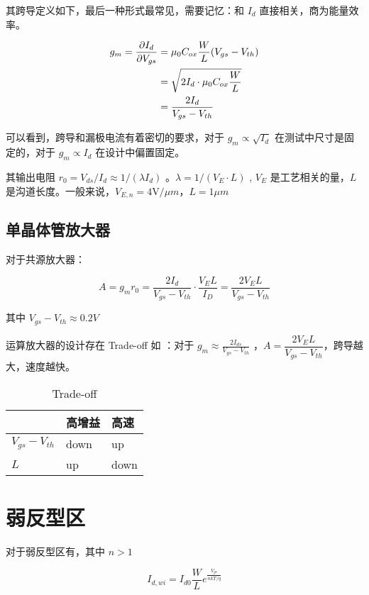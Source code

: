 \documentclass[cn,11pt,chinese,black,simple]{../elegantbook}
\begin{document}
其跨导定义如下，最后一种形式最常见，需要记忆：和 \(I_d\) 直接相关，商为能量效率。

\[
\begin{aligned}
    g_m = \frac{\partial{}I_d}{\partial{}V_{gs}} &= \mu_0 C_{ox} \frac{W}{L}(V_{gs} - V_{th}) \\
    &= \sqrt{{2 I_d \cdot \mu_0 C_{ox} \frac{W}{L}}}\\
    &= \frac{2 I_d}{V_{gs} - V_{th}}
\end{aligned}
\]

可以看到，跨导和漏极电流有着密切的要求，对于 \(g_m \propto \sqrt{I_d}\) 在测试中尺寸是固定的，对于 \(g_m \propto I_d\) 在设计中偏置固定。

其输出电阻 \(r_0 = V_{ds} / I_d \approx 1 / (\lambda I_d)\) 。\(\lambda = 1/(V_E \cdot L)\) , \(V_E\) 是工艺相关的量，\(L\) 是沟道长度。一般来说，\(V_{E,n} = 4 \text{V/}\mu m\)，\(L = 1 \mu m\)

\subsection{单晶体管放大器}

对于共源放大器：

\[A = g_m r_0 = \frac{2 I_d}{V_{gs} - V_{th}} \cdot \frac{V_E L}{I_D} = \frac{2 V_E L}{V_{gs} - V_{th}}\]

其中 \(V_{gs} - V_{th} \approx 0.2 V\)

运算放大器的设计存在 Trade-off 如 ：对于 \(g_m \approx \frac{2 I_{ds}}{V_{gs} - V_{th}}\) ，\(A = \dfrac{2 V_E L}{V_{gs} - V_{th}}\)，跨导越大，速度越快。

\begin{table}[htb]
    \centering
    \caption{Trade-off}\label{tab:01:1}
    \begin{tabular}{lll}
        \hline
        & 高增益  & 高速   \\ \hline
\(V_{gs}-V_{th}\) & down & up   \\
\(L\)             & up   & down \\ \hline
    \end{tabular}
\end{table}

\section{弱反型区}

对于弱反型区有，其中 \(n > 1\) 

\[I_{d,wi} = I_{d0} \frac{W}{L} e^{\frac{V_{gs}}{nkT/q}}\]
\end{document}
